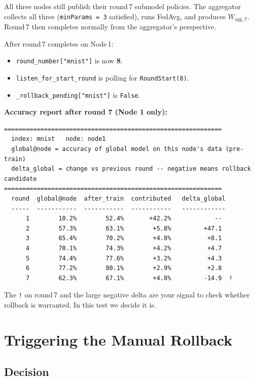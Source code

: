 \documentclass[11pt,a4paper]{article}
\newcommand{\Wagg}[1]{$W_{\text{agg},#1}$}
\begin{document}
All three nodes still publish their round\,7 submodel policies.  The
aggregator collects all three (\texttt{minParams\,=\,3} satisfied),
runs FedAvg, and produces \Wagg{7}.  Round\,7 then completes normally
from the aggregator's perspective.

\medskip
\noindent After round\,7 completes on Node\,1:
\begin{itemize}[nosep]
  \item \texttt{round\_number["mnist"]} is now \textbf{8}.
  \item \texttt{listen\_for\_start\_round} is polling for
        \texttt{RoundStart(8)}.
  \item \texttt{\_rollback\_pending["mnist"]} is \texttt{False}.
\end{itemize}

\bigskip
\noindent\textbf{Accuracy report after round 7 (Node 1 only):}

\begin{lstlisting}[style=log]
============================================================
  index: mnist   node: node1
  global@node = accuracy of global model on this node's data (pre-train)
  delta_global = change vs previous round -- negative means rollback candidate
============================================================
  round  global@node  after_train  contributed   delta_global
  -----  -----------  -----------  -----------   ------------
      1        10.2%        52.4%       +42.2%            --
      2        57.3%        63.1%        +5.8%         +47.1
      3        65.4%        70.2%        +4.8%          +8.1
      4        70.1%        74.3%        +4.2%          +4.7
      5        74.4%        77.6%        +3.2%          +4.3
      6        77.2%        80.1%        +2.9%          +2.8
      7        62.3%        67.1%        +4.8%         -14.9  !
\end{lstlisting}

\noindent The \texttt{!} on round\,7 and the large negative delta are your
signal to check whether rollback is warranted.  In this test we decide it is.

\newpage
\section{Triggering the Manual Rollback}
\label{sec:trigger}

\subsection{Decision}
\end{document}
